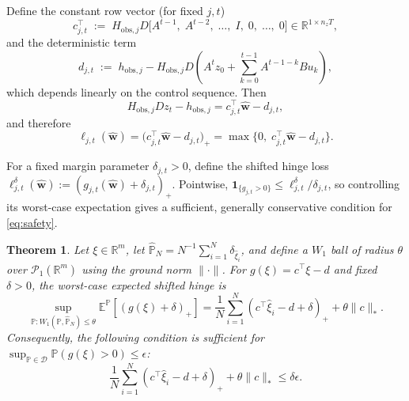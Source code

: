 \documentclass[pdflatex,sn-mathphys,Numbered]{sn-jnl}
\numberwithin{equation}{section}
\newtheorem{theorem}{Theorem}
\begin{document}
Define the constant row vector (for fixed $j,t$)
\begin{equation}
c_{j,t}^\top \;:=\; H_{\text{obs},j}D \bigl[ A^{t-1},\; A^{t-2},\; \dots,\; I,\; 0,\; \dots,\; 0 \bigr] \in \mathbb{R}^{1\times n_z T},
\end{equation}
and the deterministic term
\begin{equation}
d_{j,t} \;:=\; h_{\text{obs},j} - H_{\text{obs},j}D\left( A^t z_0 + \sum_{k=0}^{t-1} A^{t-1-k} B u_k \right),
\end{equation}
which depends linearly on the control sequence. Then
\begin{equation}
H_{\text{obs},j}D z_t - h_{\text{obs},j} = c_{j,t}^\top \hat{\mathbf{w}} - d_{j,t},
\end{equation}
and therefore
\begin{equation}
\ell_{j,t}(\hat{\mathbf{w}}) = \bigl( c_{j,t}^\top \hat{\mathbf{w}} - d_{j,t} \bigr)_+
= \max\{0,\; c_{j,t}^\top \hat{\mathbf{w}} - d_{j,t}\}.
\end{equation}

For a fixed margin parameter $\delta_{j,t}>0$, define the shifted hinge loss $\ell_{j,t}^{\delta}(\hat{\mathbf{w}}):=(g_{j,t}(\hat{\mathbf{w}})+\delta_{j,t})_+$. Pointwise, $\mathbf{1}_{\{g_{j,t}>0\}}\le \ell_{j,t}^{\delta}/\delta_{j,t}$, so controlling its worst-case expectation gives a sufficient, generally conservative condition for \eqref{eq:safety}.

\begin{theorem}
\label{thm:cc}
Let $\xi\in\mathbb{R}^{m}$, let $\hat{\mathbb{P}}_N=N^{-1}\sum_{i=1}^N\delta_{\hat{\xi}_i}$, and define a $W_1$ ball of radius $\theta$ over $\mathcal{P}_1(\mathbb{R}^{m})$ using the ground norm $\|\cdot\|$. For $g(\xi)=c^\top\xi-d$ and fixed $\delta>0$, the worst-case expected shifted hinge is
\begin{equation}
\sup_{\mathbb{P}:W_1(\mathbb{P},\hat{\mathbb{P}}_N)\le\theta}
\mathbb{E}^{\mathbb{P}}[(g(\xi)+\delta)_+]
=\frac{1}{N}\sum_{i=1}^N(c^\top\hat{\xi}_i-d+\delta)_+ + \theta\|c\|_*.
\label{eq:worst_case_hinge}
\end{equation}
Consequently, the following condition is sufficient for $\sup_{\mathbb{P}\in\mathcal{D}}\mathbb{P}(g(\xi)>0)\le\epsilon$:
\begin{equation}
\frac{1}{N}\sum_{i=1}^N(c^\top\hat{\xi}_i-d+\delta)_+ + \theta\|c\|_* \le \delta\epsilon.
\label{eq:drcc_sufficient}
\end{equation}
\end{theorem}
\end{document}
